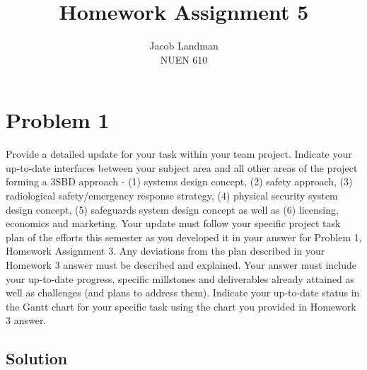 \documentclass[a4paper]{article}
\title{Homework Assignment 5}
\author{Jacob Landman\\[.5cm]NUEN 610{}}
\begin{document}
\maketitle

\newpage


\newpage
\section*{Problem 1}
Provide a detailed update for your task within your team project. Indicate your up-to-date interfaces between your subject area and all other areas of the project forming a 3SBD approach - (1) systems design concept, (2) safety approach, (3) radiological safety/emergency response strategy, (4) physical security system design concept, (5) safeguards system design concept as well as (6) licensing, economics and marketing. Your update must follow your specific project task plan of the efforts this semester as you developed it in your answer for Problem 1, Homework Assignment 3. Any deviations from the plan described in your Homework 3 answer must be described and explained. Your answer must include your up-to-date progress, specific millstones and deliverables already attained as well as challenges (and plans to address them). Indicate your up-to-date status in the Gantt chart for your specific task using the chart you provided in Homework 3 answer.

\subsection*{Solution}

\end{document}
